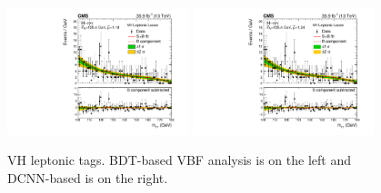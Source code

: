 \begin{figure}[h!]
\begin{center}
        \includegraphics[width=0.47\textwidth]{figures/appendix_mass_plots/CMS-HIG-16-040_Figure_013-c.pdf}
        \includegraphics[width=0.47\textwidth]{figures/appendix_mass_plots/SBplots_jackWSnewOldTTHVHLeptonicLooseTag_13TeV.pdf}
    \end{center}
    \label{fig:app_mass_plots:vh_lep}
    \caption{VH leptonic tags. BDT-based VBF analysis is on the left and DCNN-based is on the right.}
\end{figure}

